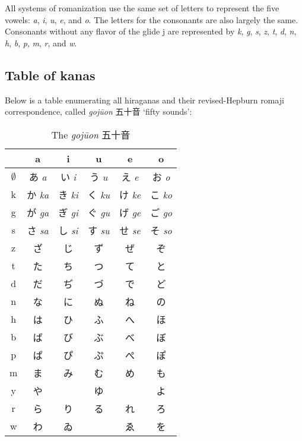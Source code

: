 \documentclass[UTF8, a4paper, oneside, scheme=plain]{ctexrep}
\newcommand{\corpus}[1]{\emph{#1}}
\newcommand{\translate}[1]{`#1'}
\begin{document}
All systems of romanization use the same set of letters to represent the five vowels:
\corpus{a}, \corpus{i}, \corpus{u}, \corpus{e}, and \corpus{o}.
The letters for the consonants are also largely the same.
Consonants without any flavor of the glide j are represented by 
\corpus{k}, \corpus{g}, \corpus{s}, \corpus{z}, \corpus{t}, \corpus{d}, \corpus{n}, 
\corpus{h}, \corpus{b}, \corpus{p}, \corpus{m}, \corpus{r}, and \corpus{w}.



\subsection{Table of kanas}\label{sec:kana}

Below is a table enumerating all hiraganas and their revised-Hepburn romaji correspondence, 
called \corpus{gojūon} 五十音 \translate{fifty sounds}:
\begin{table}[H]
    \caption{The \corpus{gojūon} 五十音}
    \label{tbl:hiragana-chart}
    \centering
    \begin{tabular}{cccccc}
        \toprule
         & a & i & u & e & o \\ 
        \midrule
        $\emptyset$ & あ \corpus{a} & い \corpus{i} & う \corpus{u} & え \corpus{e} & お \corpus{o} \\ 
        k & か \corpus{ka} & き \corpus{ki} & く \corpus{ku} & け \corpus{ke} & こ \corpus{ko} \\ 
        g & が \corpus{ga} & ぎ \corpus{gi} & ぐ \corpus{gu} & げ \corpus{ge} & ご \corpus{go} \\ 
        s & さ \corpus{sa} & し \corpus{si} & す \corpus{su} & せ \corpus{se} & そ \corpus{so} \\ 
        z & ざ & じ & ず & ぜ & ぞ \\ 
        t & た & ち & つ & て & と \\ 
        d & だ & ぢ & づ & で & ど \\ 
        n & な & に & ぬ & ね & の \\ 
        h & は & ひ & ふ & へ & ほ \\ 
        b & ば & び & ぶ & べ & ぼ \\ 
        p & ぱ & ぴ & ぷ & ぺ & ぽ \\ 
        m & ま & み & む & め & も \\ 
        y & や & ~ & ゆ & ~ & よ \\ 
        r & ら & り & る & れ & ろ \\ 
        w & わ & ゐ & ~ & ゑ & を \\ 
        \bottomrule
    \end{tabular}
\end{table}
\end{document}
